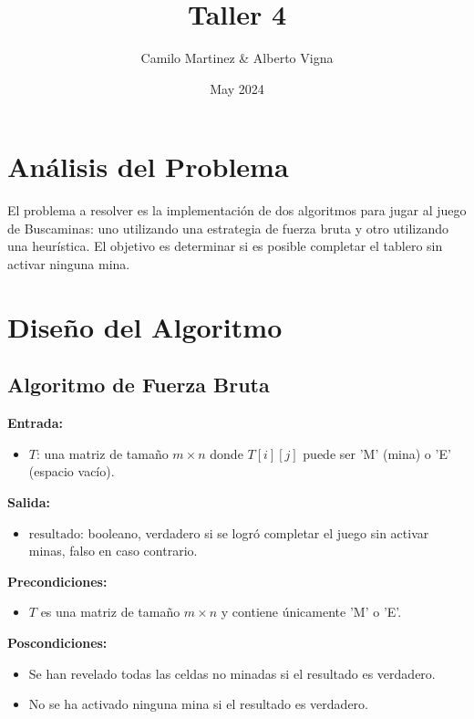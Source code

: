 \documentclass{article}
\title{Taller 4}
\author{Camilo Martinez & Alberto Vigna}
\date{May 2024}
\begin{document}
\maketitle

\section*{Análisis del Problema}

El problema a resolver es la implementación de dos algoritmos para jugar al juego de Buscaminas: uno utilizando una estrategia de fuerza bruta y otro utilizando una heurística. El objetivo es determinar si es posible completar el tablero sin activar ninguna mina.

\section*{Diseño del Algoritmo}

\subsection*{Algoritmo de Fuerza Bruta}

\textbf{Entrada:}
\begin{itemize}
    \item \( T \): una matriz de tamaño \( m \times n \) donde \( T[i][j] \) puede ser 'M' (mina) o 'E' (espacio vacío).
\end{itemize}

\textbf{Salida:}
\begin{itemize}
    \item \( \text{resultado} \): booleano, verdadero si se logró completar el juego sin activar minas, falso en caso contrario.
\end{itemize}

\textbf{Precondiciones:}
\begin{itemize}
    \item \( T \) es una matriz de tamaño \( m \times n \) y contiene únicamente 'M' o 'E'.
\end{itemize}

\textbf{Poscondiciones:}
\begin{itemize}
    \item Se han revelado todas las celdas no minadas si el resultado es verdadero.
    \item No se ha activado ninguna mina si el resultado es verdadero.
\end{itemize}
\end{document}
